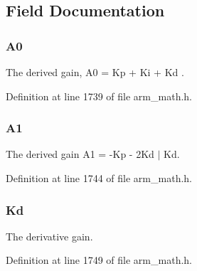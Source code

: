 \subsection{Field Documentation}
\subsubsection[{\texorpdfstring{A0}{A0}}]{ A0}\hypertarget{structarm__pid__instance__q15_a1aa73268c65cea0c7bc66bb70ff35205}{}\label{structarm__pid__instance__q15_a1aa73268c65cea0c7bc66bb70ff35205}
The derived gain, A0 = Kp + Ki + Kd . 

Definition at line 1739 of file arm\+\_\+math.\+h.

\subsubsection[{\texorpdfstring{A1}{A1}}]{ A1}\hypertarget{structarm__pid__instance__q15_aeb897c84724b56948e4222aca8d0e1f4}{}\label{structarm__pid__instance__q15_aeb897c84724b56948e4222aca8d0e1f4}
The derived gain A1 = -\/\+Kp -\/ 2\+Kd $\vert$ Kd. 

Definition at line 1744 of file arm\+\_\+math.\+h.

\subsubsection[{\texorpdfstring{Kd}{Kd}}]{ Kd}\hypertarget{structarm__pid__instance__q15_abf38d18de1e16bc6d86846fedf8534fe}{}\label{structarm__pid__instance__q15_abf38d18de1e16bc6d86846fedf8534fe}
The derivative gain. 

Definition at line 1749 of file arm\+\_\+math.\+h.

